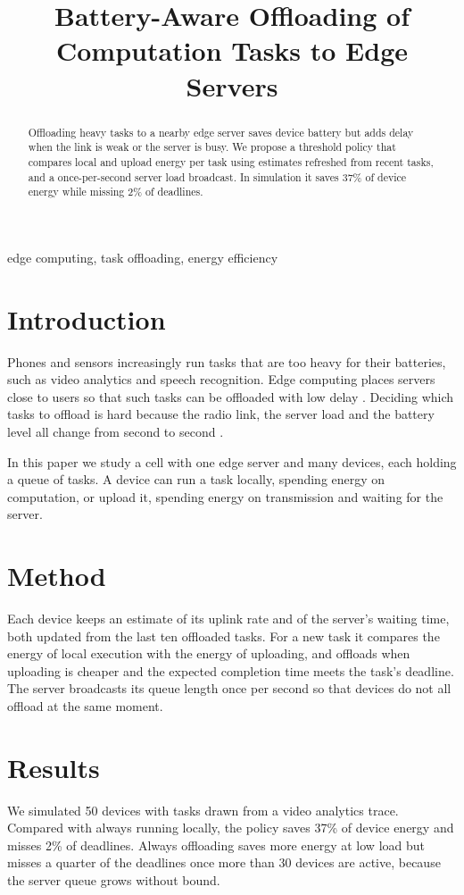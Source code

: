 \documentclass[conference]{IEEEtran}
\begin{document}
\title{Battery-Aware Offloading of Computation Tasks to Edge Servers}
\author{}
\maketitle
\begin{abstract}
Offloading heavy tasks to a nearby edge server saves device battery but adds delay when the link is weak or the server is busy. We propose a threshold policy that compares local and upload energy per task using estimates refreshed from recent tasks, and a once-per-second server load broadcast. In simulation it saves 37\% of device energy while missing 2\% of deadlines.
\end{abstract}
\begin{IEEEkeywords}
edge computing, task offloading, energy efficiency
\end{IEEEkeywords}
\section{Introduction}
Phones and sensors increasingly run tasks that are too heavy for their batteries, such as video analytics and speech
recognition. Edge computing places servers close to users so that such tasks can be offloaded with low delay
\cite{shi}. Deciding which tasks to offload is hard because the radio link, the server load and the battery level all
change from second to second \cite{mao}.

In this paper we study a cell with one edge server and many devices, each holding a queue of tasks. A device can run a task locally,
spending energy on computation, or upload it, spending energy on transmission and waiting for the server.

\section{Method}
Each device keeps an estimate of its uplink rate and of the server's waiting time, both updated from the last ten
offloaded tasks. For a new task it compares the energy of local execution with the energy of uploading, and offloads
when uploading is cheaper and the expected completion time meets the task's deadline. The server broadcasts its queue
length once per second so that devices do not all offload at the same moment.

\section{Results}
We simulated 50 devices with tasks drawn from a video analytics trace. Compared with always running locally, the policy
saves 37\% of device energy and misses 2\% of deadlines. Always offloading saves more energy at low load but misses a
quarter of the deadlines once more than 30 devices are active, because the server queue grows without bound.
\end{document}
